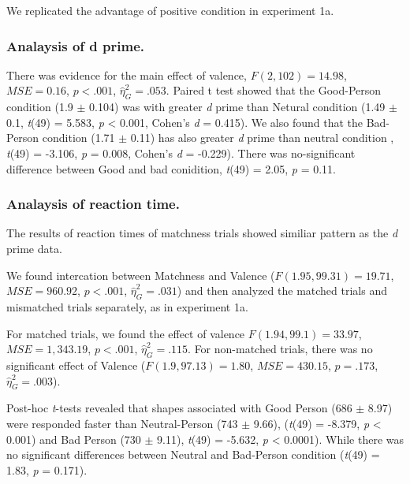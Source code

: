 \documentclass[man]{apa6}
\begin{document}
We replicated the advantage of positive condition in experiment 1a.

\hypertarget{analaysis-of-d-prime.-1}{%
\subsubsection{Analaysis of d prime.}\label{analaysis-of-d-prime.-1}}

There was evidence for the main effect of valence, \(F(2, 102) = 14.98\), \(\mathit{MSE} = 0.16\), \(p < .001\), \(\hat{\eta}^2_G = .053\). Paired t test showed that the Good-Person condition (1.9 \(\pm\) 0.104) was with greater \emph{d} prime than Netural condition (1.49 \(\pm\) 0.1, \emph{t}(49) = 5.583, \emph{p} \textless{} 0.001, Cohen's \emph{d} = 0.415). We also found that the Bad-Person condition (1.71 \(\pm\) 0.11) has also greater \emph{d} prime than neutral condition , \emph{t}(49) = -3.106, \emph{p} = 0.008, Cohen's \emph{d} = -0.229). There was no-significant difference between Good and bad conidition, \emph{t}(49) = 2.05, \emph{p} = 0.11.

\hypertarget{analaysis-of-reaction-time.-1}{%
\subsubsection{Analaysis of reaction time.}\label{analaysis-of-reaction-time.-1}}

The results of reaction times of matchness trials showed similiar pattern as the \emph{d} prime data.

We found intercation between Matchness and Valence (\(F(1.95, 99.31) = 19.71\), \(\mathit{MSE} = 960.92\), \(p < .001\), \(\hat{\eta}^2_G = .031\)) and then analyzed the matched trials and mismatched trials separately, as in experiment 1a.

For matched trials, we found the effect of valence \(F(1.94, 99.1) = 33.97\), \(\mathit{MSE} = 1,343.19\), \(p < .001\), \(\hat{\eta}^2_G = .115\). For non-matched trials, there was no significant effect of Valence (\(F(1.9, 97.13) = 1.80\), \(\mathit{MSE} = 430.15\), \(p = .173\), \(\hat{\eta}^2_G = .003\)).

Post-hoc \emph{t}-tests revealed that shapes associated with Good Person (686 \(\pm\) 8.97) were responded faster than Neutral-Person (743 \(\pm\) 9.66), (\emph{t}(49) = -8.379, \emph{p} \textless{} 0.001) and Bad Person (730 \(\pm\) 9.11), \emph{t}(49) = -5.632, \emph{p} \textless{} 0.0001). While there was no significant differences between Neutral and Bad-Person condition (\emph{t}(49) = 1.83, \emph{p} = 0.171).
\end{document}
